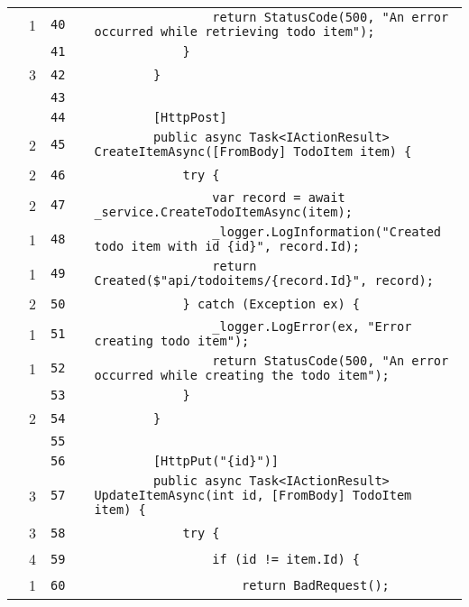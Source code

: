 \documentclass[a4paper,landscape,10pt]{article}
\begin{document}
\begin{longtable}[l]{lrrll}
\cellcolor{green} & 1 & \verb~40~ & & \verb~                return StatusCode(500, "An error occurred while retrieving todo item");~\\
\cellcolor{gray} &  & \verb~41~ & & \verb~            }~\\
\cellcolor{green} & 3 & \verb~42~ & & \verb~        }~\\
\cellcolor{gray} &  & \verb~43~ & & \verb~~\\
\cellcolor{gray} &  & \verb~44~ & & \verb~        [HttpPost]~\\
\cellcolor{green} & 2 & \verb~45~ & & \verb~        public async Task<IActionResult> CreateItemAsync([FromBody] TodoItem item) {~\\
\cellcolor{green} & 2 & \verb~46~ & & \verb~            try {~\\
\cellcolor{green} & 2 & \verb~47~ & & \verb~                var record = await _service.CreateTodoItemAsync(item);~\\
\cellcolor{green} & 1 & \verb~48~ & & \verb~                _logger.LogInformation("Created todo item with id {id}", record.Id);~\\
\cellcolor{green} & 1 & \verb~49~ & & \verb~                return Created($"api/todoitems/{record.Id}", record);~\\
\cellcolor{green} & 2 & \verb~50~ & & \verb~            } catch (Exception ex) {~\\
\cellcolor{green} & 1 & \verb~51~ & & \verb~                _logger.LogError(ex, "Error creating todo item");~\\
\cellcolor{green} & 1 & \verb~52~ & & \verb~                return StatusCode(500, "An error occurred while creating the todo item");~\\
\cellcolor{gray} &  & \verb~53~ & & \verb~            }~\\
\cellcolor{green} & 2 & \verb~54~ & & \verb~        }~\\
\cellcolor{gray} &  & \verb~55~ & & \verb~~\\
\cellcolor{gray} &  & \verb~56~ & & \verb~        [HttpPut("{id}")]~\\
\cellcolor{green} & 3 & \verb~57~ & & \verb~        public async Task<IActionResult> UpdateItemAsync(int id, [FromBody] TodoItem item) {~\\
\cellcolor{green} & 3 & \verb~58~ & & \verb~            try {~\\
\cellcolor{green} & 4 & \verb~59~ & & \verb~                if (id != item.Id) {~\\
\cellcolor{green} & 1 & \verb~60~ & & \verb~                    return BadRequest();~\\

\end{longtable}
\end{document}
